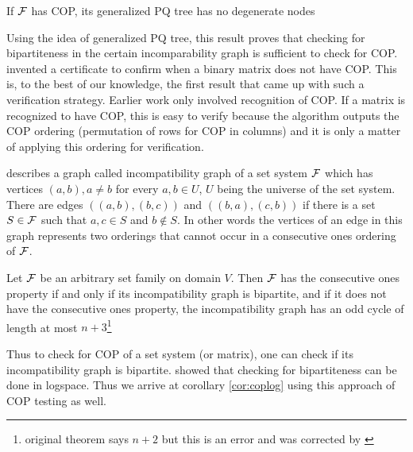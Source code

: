 \documentclass{llncs}
\def\cF{{\cal F}}
\begin{document}
\begin{theorem}
If $\cF$ has COP, its generalized PQ tree has no degenerate nodes  
\end{theorem}

Using the idea of generalized PQ tree, this result proves that checking for bipartiteness in
the certain incomparability graph is sufficient to check for COP. 
\cite{mcc04} invented a certificate to confirm when a binary matrix
does not have COP. This is, to the best of our knowledge, the first
result that came up with such a verification strategy. Earlier work
only involved recognition of COP. If a matrix is recognized to have
COP, this is easy to verify because the algorithm outputs the COP
ordering (permutation of rows for COP in columns) and it is only a
matter of applying this ordering for verification.

\cite{mcc04} describes a graph called incompatibility graph of a set
system $\cF$ which has
vertices $(a,b), a \ne b$ for every $a, b \in U$, $U$ being the
universe of the set system. There are edges $((a,b),(b,c))$ and $((b,a),(c,b))$
if there is a set $S \in \cF$ such that $a, c \in S$ and $b \notin
S$. In other words the vertices of an edge in this graph represents
two orderings that cannot occur in a consecutive ones ordering of $\cF$.

\begin{theorem}
  Let $\cF$ be an arbitrary set family on domain $V$. Then $\cF$ has
  the consecutive ones property if and only if its incompatibility
  graph is bipartite, and if it does not have the consecutive ones
  property, the incompatibility graph has an odd cycle of length at
  most $n+3$\footnote{original theorem says $n+2$ but this is an error
  and was corrected by \cite{d08phd}}
\end{theorem}

Thus to check for COP of a set system (or matrix), one can check if
its incompatibility graph is bipartite. \cite{rei84} showed that
checking for bipartiteness can be done in logspace. Thus we arrive at
corollary \ref{cor:coplog} using this approach of COP testing as well. 



%

\end{document}
